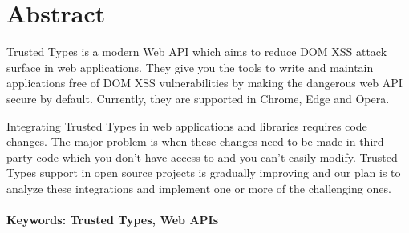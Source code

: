 \documentclass[12pt, twoside]{book}
\begin{document}
\newpage
\section*{Abstract}

Trusted Types is a modern Web API which aims to reduce DOM XSS attack surface in web applications.
They give you the tools to write and maintain applications free of DOM XSS vulnerabilities by making
the dangerous web API secure by default. Currently, they are supported in Chrome, Edge and Opera.

Integrating Trusted Types in web applications and libraries requires code changes. The major problem
is when these changes need to be made in third party code which you don't have access to and you
can't easily modify. Trusted Types support in open source projects is gradually improving and our
plan is to analyze these integrations and implement one or more of the challenging ones.

\paragraph*{Keywords: Trusted Types, Web APIs}


%
%



\newpage

\tableofcontents



\newpage



\mainmatter
\end{document}
